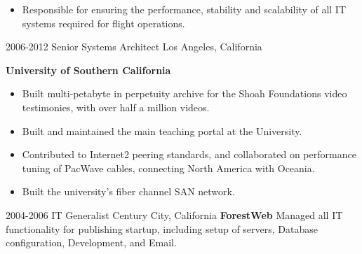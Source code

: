 \begin{entrylist}
{\begin{itemize}
        \item Responsible for ensuring the performance, stability and scalability of all IT systems required for flight operations. 
      \end{itemize}
    }
  \entry
    {2006-2012}
    {Senior Systems Architect}
    {Los Angeles, California}
    {
      \textbf{University of Southern California}
      \begin{itemize}
        \item Built multi-petabyte in perpetuity archive for the Shoah Foundations video testimonies, with  over half a million videos. 
        \item Built and maintained the main teaching portal at the University.
        \item Contributed to Internet2 peering standards, and collaborated on performance tuning of PacWave cables, connecting North America with Oceania.
        \item Built the university's fiber channel SAN network.
      \end{itemize}
    }
  \entry
    {2004-2006}
    {IT Generalist}
    {Century City, California}
    {
      \textbf{ForestWeb}
      \newline
     Managed all IT functionality for publishing startup, including setup of servers, Database configuration, Development, and Email.
    }
\end{entrylist}
